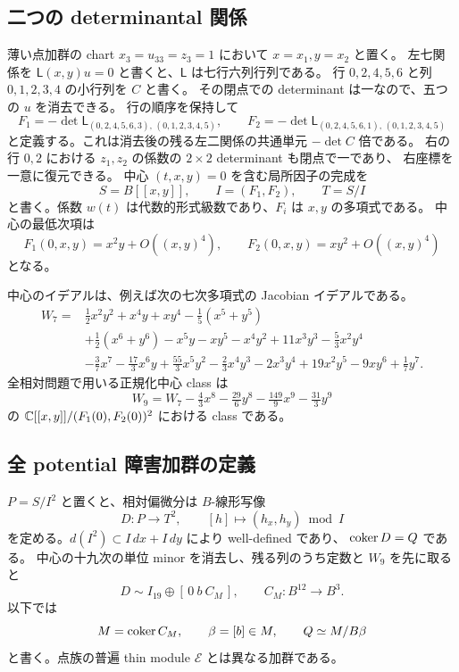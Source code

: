 \subsection{二つの determinantal 関係}

薄い点加群の chart $x_3=u_{33}=z_3=1$ において $x=x_1,y=x_2$ と置く。
左七関係を $\mathsf L(x,y)u=0$ と書くと、$\mathsf L$ は七行六列行列である。
行 $0,2,4,5,6$ と列 $0,1,2,3,4$ の小行列を $C$ と書く。
その閉点での determinant は一なので、五つの $u$ を消去できる。
行の順序を保持して
\[
 F_1=-\det\mathsf L_{(0,2,4,5,6,3),\,(0,1,2,3,4,5)},\qquad
 F_2=-\det\mathsf L_{(0,2,4,5,6,1),\,(0,1,2,3,4,5)}
\]
と定義する。これは消去後の残る左二関係の共通単元 $-\det C$ 倍である。
右の行 $0,2$ における $z_1,z_2$ の係数の $2\times2$ determinant も閉点で一であり、
右座標を一意に復元できる。
中心 $(t,x,y)=0$ を含む局所因子の完成を
\[
 S=B[[x,y]],\qquad I=(F_1,F_2),\qquad T=S/I
\]
と書く。係数 $w(t)$ は代数的形式級数であり、$F_i$ は $x,y$ の多項式である。
中心の最低次項は
\[
 F_1(0,x,y)=x^2y+O((x,y)^4),\qquad
 F_2(0,x,y)=xy^2+O((x,y)^4)
\]
となる。

中心のイデアルは、例えば次の七次多項式の Jacobian イデアルである。
\begin{align*}
W_7={}&\tfrac12x^2y^2+x^4y+xy^4-\tfrac15(x^5+y^5)\\
&+\tfrac12(x^6+y^6)-x^5y-xy^5-x^4y^2+11x^3y^3-\tfrac53x^2y^4\\
&-\tfrac37x^7-\tfrac{17}{3}x^6y+\tfrac{55}{3}x^5y^2
-\tfrac23x^4y^3-2x^3y^4+19x^2y^5-9xy^6+\tfrac17y^7.
\end{align*}
全相対問題で用いる正規化中心 class は
\[
 W_9=W_7-\tfrac43x^8-\tfrac{29}{6}y^8-\tfrac{149}{9}x^9-\tfrac{31}{3}y^9
\]
の $\mathbb C[[x,y]]/(F_1(0),F_2(0))^2$ における class である。

\subsection{全 potential 障害加群の定義}

$P=S/I^2$ と置くと、相対偏微分は $B$-線形写像
\[
 D:P\longrightarrow T^2,\qquad [h]\longmapsto(h_x,h_y)\bmod I
\]
を定める。$d(I^2)\subset I\,dx+I\,dy$ により well-defined であり、
$\operatorname{coker} D=Q$ である。
中心の十九次の単位 minor を消去し、残る列のうち定数と $W_9$ を先に取ると
\begin{equation}\label{eq:Schur-obstruction}
 D\sim I_{19}\oplus[\,0\ b\ C_M\,],\qquad
 C_M:B^{12}\longrightarrow B^3.
\end{equation}
以下では
\[
 M=\operatorname{coker} C_M,\qquad \beta=[b]\in M,
 \qquad Q\simeq M/B\beta
\]
と書く。点族の普遍 thin module $\mathcal E$ とは異なる加群である。

